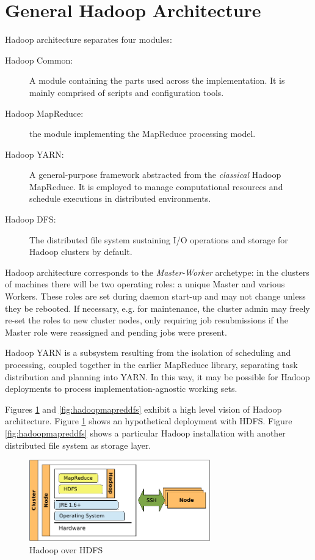 \section{General Hadoop Architecture}\label{sec:arquitecturahadoop}
\noindent Hadoop architecture separates four modules:
\begin{description}
 \item[Hadoop Common:] A module containing the parts used across the implementation. It is mainly comprised of scripts and configuration tools.
 \item[Hadoop MapReduce:] the module implementing the MapReduce processing model.
 \item[Hadoop YARN:] A general-purpose framework abstracted from the \emph{classical} Hadoop MapReduce. It is employed to manage computational resources and schedule executions in distributed environments.
 \item[Hadoop DFS:] The distributed file system sustaining I/O operations and storage for Hadoop clusters by default.
\end{description}

Hadoop architecture corresponds to the \emph{Master-Worker} archetype: in the clusters of machines there will be two operating roles: a unique Master and various Workers. These roles are set during daemon start-up and may not change unless they be rebooted. If necessary, e.g. for maintenance, the cluster admin may freely re-set the roles to new cluster nodes, only requiring job resubmissions if the Master role were reassigned and pending jobs were present.

Hadoop YARN is a subsystem resulting from the isolation of scheduling and processing, coupled together in the earlier MapReduce library, separating task distribution and planning into YARN. In this way, it may be possible for Hadoop deployments to process implementation-agnostic working sets.

Figures \ref{fig:hadoopmapredhdfs} and \ref{fig:hadoopmapreddfs} exhibit a high level vision of Hadoop architecture. Figure \ref{fig:hadoopmapredhdfs} shows an hypothetical deployment with HDFS. Figure \ref{fig:hadoopmapreddfs} shows a particular Hadoop installation with another distributed file system as storage layer.

\begin{figure}[tbp]
\begin{center}
\includegraphics[width=0.7\textwidth]{imagenes/015.pdf}
 \caption{Hadoop over HDFS}
\label{fig:hadoopmapredhdfs}
\end{center}
\end{figure}

